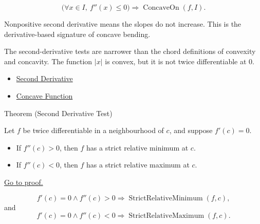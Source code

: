 \begin{remark*}
\[
  \bigl(\forall x\in I,\ f''(x)\leq 0\bigr)
  \Longrightarrow
  \operatorname{ConcaveOn}(f,I).
\]
\end{remark*}

\begin{remark*}[Interpretation]
Nonpositive second derivative means the slopes do not increase. This is the derivative-based signature of concave bending.
\end{remark*}

\begin{remark*}[Interpretation]
The second-derivative tests are narrower than the chord definitions of convexity and concavity. The function $|x|$ is convex, but it is not twice differentiable at $0$.
\end{remark*}

\begin{dependencies}
\begin{itemize}
  \item \hyperref[def:second-derivative]{Second Derivative}
  \item \hyperref[def:concave-function]{Concave Function}
\end{itemize}
\end{dependencies}



\begin{theorembox}{Theorem (Second Derivative Test)}
\begin{theorem}
\label{thm:second-derivative-test}
Let $f$ be twice differentiable in a neighbourhood of $c$, and suppose $f'(c)=0$.
\begin{itemize}
  \item If $f''(c)>0$, then $f$ has a strict relative minimum at $c$.
  \item If $f''(c)<0$, then $f$ has a strict relative maximum at $c$.
\end{itemize}
\hyperref[prf:second-derivative-test]{Go to proof.}
\end{theorem}
\end{theorembox}

\begin{remark*}
\[
  f'(c)=0\land f''(c)>0 \Rightarrow \operatorname{StrictRelativeMinimum}(f,c),
\]
and
\[
  f'(c)=0\land f''(c)<0 \Rightarrow \operatorname{StrictRelativeMaximum}(f,c).
\]
\end{remark*}

